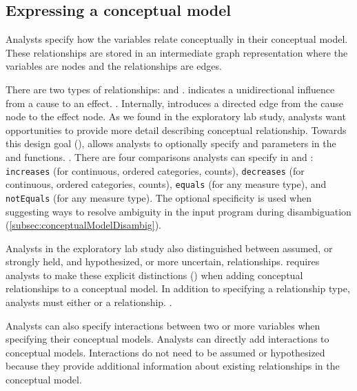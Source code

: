 \subsection{Expressing a conceptual model}
Analysts specify how the variables relate conceptually in their conceptual
model. These relationships are stored in an intermediate graph representation
where the variables are nodes and the relationships are edges. 

There are two types of relationships: \causes and \relates. \causes indicates a
unidirectional influence from a cause to an effect. . 
Internally,
\causes introduces a directed edge from the cause node to the effect node. As we
found in the exploratory lab study, analysts want opportunities to provide more
detail describing conceptual relationship. Towards this design goal
(\optionalSpecificity), \rTisane allows analysts to optionally specify \when and
\then parameters in the \causes and \relates functions. . 
There are four comparisons analysts can specify in \when and \then:
\texttt{increases} (for continuous, ordered categories, counts),
\texttt{decreases} (for continuous, ordered categories, counts), \texttt{equals}
(for any measure type), and \texttt{notEquals} (for any measure type). The
optional specificity is used when suggesting ways to resolve ambiguity in the
input program during disambiguation (\autoref{subsec:conceptualModelDisambig}).

Analysts in the exploratory lab study also distinguished between assumed, or
strongly held, and hypothesized, or more uncertain, relationships. \rTisane
requires analysts to make these explicit distinctions (\assumeHypothesize) when
adding conceptual relationships to a conceptual model. In addition to specifying
a relationship type, analysts must either \assume or \hypothesize a relationship.
.


Analysts can also specify interactions between two or more variables when
specifying their conceptual models. %
Analysts can directly add interactions to conceptual models. Interactions do not
need to be assumed or hypothesized because they provide additional information
about existing relationships in the conceptual model. 


